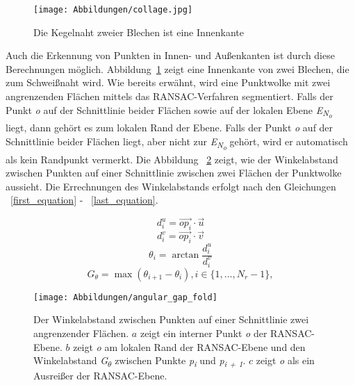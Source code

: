 \begin{figure}[!b]
	\texttt{[image: Abbildungen/collage.jpg]}
	\centering
	\caption[Innenkante zweier Blechen]{Die Kegelnaht zweier Blechen ist eine Innenkante}
	\label{fig: Innenkante}
\end{figure}

Auch die Erkennung von Punkten in Innen- und Außenkanten ist durch diese Berechnungen möglich. Abbildung~\ref{fig: Innenkante} zeigt eine Innenkante von zwei Blechen, die zum Schweißnaht wird. Wie bereits erwähnt, wird eine Punktwolke mit zwei angrenzenden Flächen mittels das RANSAC-Verfahren segmentiert. Falls der Punkt \textit{o} auf der Schnittlinie beider Flächen sowie auf der lokalen Ebene \textit{E\textsubscript{N\textsubscript{o}}} liegt, dann gehört es zum lokalen Rand der Ebene. Falls der Punkt \textit{o} auf der Schnittlinie beider Flächen liegt, aber nicht zur \textit{E\textsubscript{N\textsubscript{o}}} gehört, wird er automatisch als kein Randpunkt vermerkt. Die Abbildung ~\ref{edge_fold} zeigt, wie der Winkelabstand zwischen Punkten auf einer Schnittlinie zwischen zwei Flächen der Punktwolke aussieht. Die Errechnungen des Winkelabstands erfolgt nach den Gleichungen ~\ref{first_equation} - ~\ref{last_equation}.


\begin{equation}
\label{first_equation}
d_i^u = \overrightarrow{{op}_i} \cdot \vec{u}
\end{equation}
\begin{equation}
d_i^v = \overrightarrow{{op}_i} \cdot \vec{v}
\end{equation}
\begin{equation}
\theta_i = \arctan{\frac{d_i^u}{d_i^v}}
\end{equation}
\begin{equation}
G_\theta = \max(\theta_{i + 1} - \theta_i), i \in \{1, \ldots, N_r - 1\},
\label{last_equation}
\end{equation}

\begin{figure}[!b]
	\texttt{[image: Abbildungen/angular\_gap\_fold]}
	\centering
	\caption{Der Winkelabstand zwischen Punkten auf einer Schnittlinie zwei angrenzender Flächen. \textbf{\(a\)} zeigt ein interner Punkt \textit{o} der RANSAC-Ebene. \textbf{\(b\)} zeigt \textit{o} am lokalen Rand der RANSAC-Ebene und den Winkelabstand \textit{G\textsubscript{$\theta$}} zwischen Punkte \textit{p\textsubscript{i}} und \textit{p\textsubscript{i + 1}}. \textbf{\(c\)} zeigt \textit{o} als ein Ausreißer der RANSAC-Ebene. \autocite{ni_edge_2016}}
	\label{edge_fold}
\end{figure}

